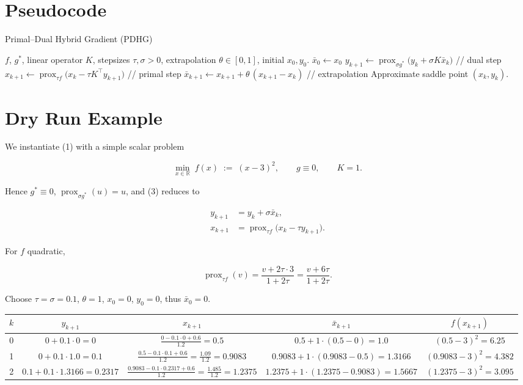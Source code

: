 \documentclass{article}
\begin{document}
\section*{Pseudocode}
\begin{algorithm}[H]
\caption{Primal–Dual Hybrid Gradient (PDHG)}\label{alg:PDHG}
\begin{algorithmic}[1]
\REQUIRE $f$, $g^{*}$, linear operator $K$, stepsizes $\tau,\sigma>0$, extrapolation $\theta\in[0,1]$, initial $x_{0},y_{0}$.
\STATE $\bar{x}_{0}\gets x_{0}$
    \STATE $y_{k+1}\gets\operatorname{prox}_{\sigma g^{*}}\!\bigl(y_{k}+\sigma K\bar{x}_{k}\bigr)$ \hfill // dual step
    \STATE $x_{k+1}\gets\operatorname{prox}_{\tau f}\!\bigl(x_{k}-\tau K^{\!\top}y_{k+1}\bigr)$ \hfill // primal step
    \STATE $\bar{x}_{k+1}\gets x_{k+1}+\theta\,(x_{k+1}-x_{k})$ \hfill // extrapolation
\ENDFOR
\ENSURE Approximate saddle point $(x_{k},y_{k})$.
\end{algorithmic}
\end{algorithm}

\section*{Dry Run Example}
We instantiate (1) with a simple scalar problem  

\[
\min_{x\in\mathbb{R}} \; f(x) \;:=\;(x-3)^{2},
\qquad g\equiv0,\qquad K=1.
\]

Hence $g^{*}\equiv 0$, $\operatorname{prox}_{\sigma g^{*}}(u)=u$, and (3) reduces to  

\[
\begin{aligned}
y_{k+1}&=y_{k}+\sigma \bar{x}_{k},\\
x_{k+1}&=\operatorname{prox}_{\tau f}\!\bigl(x_{k}-\tau y_{k+1}\bigr).
\end{aligned}
\]

For $f$ quadratic,  

\[
\operatorname{prox}_{\tau f}(v)=\frac{v+2\tau\cdot3}{1+2\tau}
      =\frac{v+6\tau}{1+2\tau}.
\]

Choose $\tau=\sigma=0.1$, $\theta=1$, $x_{0}=0$, $y_{0}=0$, thus $\bar{x}_{0}=0$.

\begin{center}
\begin{tabular}{c|c|c|c|c}
$k$ & $y_{k+1}$ & $x_{k+1}$ & $\bar{x}_{k+1}$ & $f(x_{k+1})$\\\hline
0 & $0+0.1\cdot0=0$ &
$\displaystyle\frac{0-0.1\cdot0+0.6}{1.2}=0.5$ &
$0.5+1\cdot(0.5-0)=1.0$ &
$(0.5-3)^{2}=6.25$\\[2mm]
1 & $0+0.1\cdot1.0=0.1$ &
$\displaystyle\frac{0.5-0.1\cdot0.1+0.6}{1.2}
      =\frac{1.09}{1.2}=0.9083$ &
$0.9083+1\cdot(0.9083-0.5)=1.3166$ &
$(0.9083-3)^{2}=4.382$\\[2mm]
2 & $0.1+0.1\cdot1.3166=0.2317$ &
$\displaystyle\frac{0.9083-0.1\cdot0.2317+0.6}{1.2}
      =\frac{1.485}{1.2}=1.2375$ &
$1.2375+1\cdot(1.2375-0.9083)=1.5667$ &
$(1.2375-3)^{2}=3.095$\\
\end{tabular}
\end{center}
\end{document}
